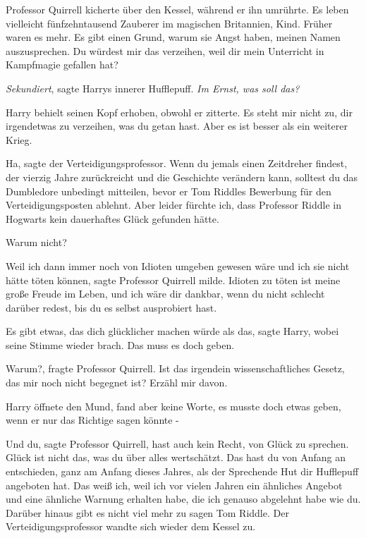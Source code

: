 Professor Quirrell kicherte über den Kessel, während er ihn umrührte. \glqq{}Es
leben vielleicht fünfzehntausend Zauberer im magischen Britannien, Kind. Früher
waren es mehr. Es gibt einen Grund, warum sie Angst haben, meinen Namen
auszusprechen. Du würdest mir das verzeihen, weil dir mein Unterricht in
Kampfmagie gefallen hat?\grqq{}

\emph{Sekundiert}, sagte Harrys innerer Hufflepuff. \emph{Im Ernst, was soll
das?}

Harry behielt seinen Kopf erhoben, obwohl er zitterte. \glqq{}Es steht mir nicht
zu, dir irgendetwas zu verzeihen, was du getan hast. Aber es ist besser als ein
weiterer Krieg.\grqq{}

\glqq{}Ha\grqq{}, sagte der Verteidigungsprofessor. \glqq{}Wenn du jemals einen
Zeitdreher findest, der vierzig Jahre zurückreicht und die Geschichte verändern
kann, solltest du das Dumbledore unbedingt mitteilen, bevor er Tom Riddles
Bewerbung für den Verteidigungsposten ablehnt. Aber leider fürchte ich, dass
Professor Riddle in Hogwarts kein dauerhaftes Glück gefunden hätte.\grqq{}

\glqq{}Warum nicht?\grqq{}

\glqq{}Weil ich dann immer noch von Idioten umgeben gewesen wäre und ich sie
nicht hätte töten können\grqq{}, sagte Professor Quirrell milde. \glqq{}Idioten
zu töten ist meine große Freude im Leben, und ich wäre dir dankbar, wenn du
nicht schlecht darüber redest, bis du es selbst ausprobiert hast.\grqq{}

\glqq{}Es gibt etwas, das dich glücklicher machen würde als das\grqq{}, sagte
Harry, wobei seine Stimme wieder brach. \glqq{}Das muss es doch geben.\grqq{}

\glqq{}Warum?\grqq{}, fragte Professor Quirrell. \glqq{}Ist das irgendein
wissenschaftliches Gesetz, das mir noch nicht begegnet ist? Erzähl mir davon.\grqq{}

Harry öffnete den Mund, fand aber keine Worte, es musste doch etwas geben, wenn
er nur das Richtige sagen könnte -

\glqq{}Und du\grqq{}, sagte Professor Quirrell, \glqq{}hast auch kein Recht, von
Glück zu sprechen. Glück ist nicht das, was du über alles wertschätzt. Das hast
du von Anfang an entschieden, ganz am Anfang dieses Jahres, als der Sprechende
Hut dir Hufflepuff angeboten hat. Das weiß ich, weil ich vor vielen Jahren ein
ähnliches Angebot und eine ähnliche Warnung erhalten habe, die ich genauso
abgelehnt habe wie du. Darüber hinaus gibt es nicht viel mehr zu sagen Tom
Riddle.\grqq{} Der Verteidigungsprofessor wandte sich wieder dem Kessel zu.

